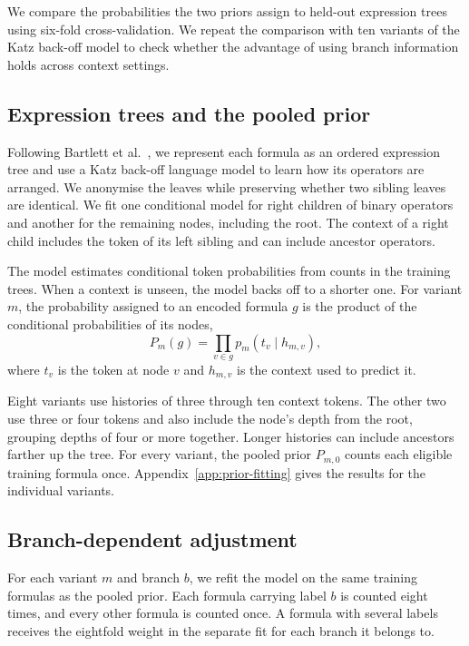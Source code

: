 \documentclass[10pt]{article}
\begin{document}
We compare the probabilities the two priors assign to held-out expression trees using six-fold cross-validation. We repeat the comparison with ten variants of the Katz back-off model to check whether the advantage of using branch information holds across context settings.

\subsection{Expression trees and the pooled prior}
Following Bartlett et al.~\citep{bartlett2023}, we represent each formula as an ordered expression tree and use a Katz back-off language model to learn how its operators are arranged. We anonymise the leaves while preserving whether two sibling leaves are identical. We fit one conditional model for right children of binary operators and another for the remaining nodes, including the root. The context of a right child includes the token of its left sibling and can include ancestor operators.

The model estimates conditional token probabilities from counts in the training trees. When a context is unseen, the model backs off to a shorter one. For variant $m$, the probability assigned to an encoded formula $g$ is the product of the conditional probabilities of its nodes,
\begin{equation}
P_m(g)=\prod_{v\in g}p_m(t_v\mid h_{m,v}),
\label{eq:tree-score}
\end{equation}
where $t_v$ is the token at node $v$ and $h_{m,v}$ is the context used to predict it.

Eight variants use histories of three through ten context tokens. The other two use three or four tokens and also include the node's depth from the root, grouping depths of four or more together. Longer histories can include ancestors farther up the tree. For every variant, the pooled prior $P_{m,0}$ counts each eligible training formula once. Appendix~\ref{app:prior-fitting} gives the results for the individual variants.

\subsection{Branch-dependent adjustment}
For each variant $m$ and branch $b$, we refit the model on the same training formulas as the pooled prior. Each formula carrying label $b$ is counted eight times, and every other formula is counted once. A formula with several labels receives the eightfold weight in the separate fit for each branch it belongs to.
\end{document}
